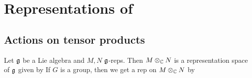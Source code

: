 \documentclass{article}
\begin{document}
\section{Representations of }

\subsection{Actions on tensor products}
Let $\mathfrak{g}$ be a Lie algebra and $M,N$ $\mathfrak{g}$-reps. Then $M \otimes_{\mathbb{C}}N$ is a representation space of $\mathfrak{g}$ given by 
If $G$ is a group, then we get a rep on $M \otimes_{\mathbb{C}} N$ by 

\begin{remarl}

\end{remarl}
\end{document}
